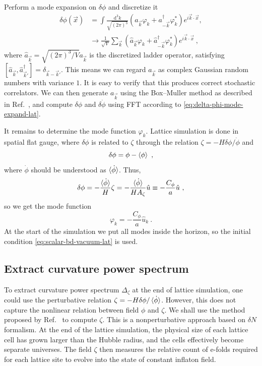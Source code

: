 \documentclass[reprint, 10pt, amsmath, amssymb, floatfix, aps, prd, superscriptaddress, nofootinbib, nobibnotes,twocolumn]{revtex4-1}
\def\dd{{\mathrm{d}}}
\begin{document}
Perform a mode expansion on $\delta\phi$ and discretize it
\begin{align}
	\delta\phi(\vec x) & = \int\frac{\dd^3k}{\sqrt{(2\pi)^3}}\left(a_{\vec k} \varphi_k + a_{-\vec k}^\dagger\varphi_k^\ast\right) e^{i\vec k\cdot\vec x},\nonumber\\
	& \to \frac{1}{\sqrt V}\sum_{\vec k}\left(\hat a_{\vec k}\varphi_k + \hat a_{-\vec k}^\dagger\varphi_k^\ast\right)e^{i\vec k\cdot\vec x}\label{eq:delta-phi-mode-expand-lat} \ ,
\end{align}
where $\hat a_{\vec k} = \sqrt{(2\pi)^3 / V}a_{\vec k}$ is the discretized ladder operator, satisfying $[\hat a_{\vec k}, \hat a_{\vec k'}^\dagger] = \delta_{\vec k - \vec k'}$. This means we can regard $a_{\vec k}$ as complex Gaussian random numbers with variance $1$. It is easy to verify that this produces correct stochastic correlators. We can then generate $a_{\vec k}$ using the Box–Muller method as described in Ref.~\cite{Caravano:2021pgc}, and compute $\delta\phi$ and $\delta\dot\phi$ using FFT according to \eqref{eq:delta-phi-mode-expand-lat}.

It remains to determine the mode function $\varphi_k$. Lattice simulation is done in spatial flat gauge, where $\delta\phi$ is related to $\zeta$ through the relation $\zeta = -H\delta\phi / \dot\phi$ and
\begin{equation}
	\delta\phi = \phi - \braket{\phi} \ ,
\end{equation}
where $\dot\phi$ should be understood as $\braket{\dot\phi}$. Thus,
\begin{equation}
	\delta\phi = -\frac{\braket{\dot\phi}}{H}\zeta = -\frac{\braket
	{\dot\phi}}{H A_\zeta}\hat u \equiv -\frac{C_\phi}{a}\hat u  \ ,
\end{equation}
so we get the mode function
\begin{equation}
	\varphi_k = -\frac{C_\phi}{a}\hat u_k \ .
\end{equation}
At the start of the simulation we put all modes inside the horizon, so the initial condition \eqref{eq:scalar-bd-vacuum-lat} is used.

\subsection{Extract curvature power spectrum}
To extract curvature power spectrum $\Delta_\zeta$ at the end of lattice simulation, one could use the perturbative relation $\zeta = -H\delta\phi / \braket{\dot\phi}$. However, this does not capture the nonlinear relation between field $\phi$ and $\zeta$. We shall use the method proposed by Ref.~\cite{Caravano:2025diq} to compute $\zeta$. This is a nonperturbative approach based on $\delta N$ formalism. At the end of the lattice simulation, the physical size of each lattice cell has grown larger than the Hubble radius, and the cells effectively become separate universes. The field $\zeta$ then measures the relative count of e-folds required for each lattice site to evolve into the state of constant inflaton field.
\end{document}
